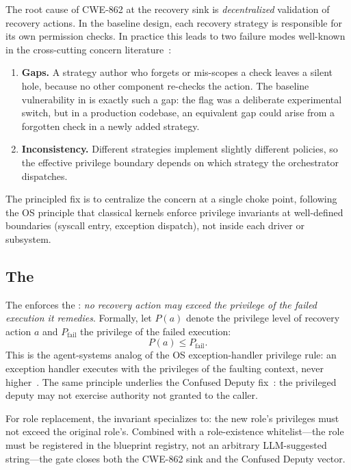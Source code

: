 The root cause of CWE-862 at the recovery sink is \emph{decentralized} validation of recovery actions. In the baseline design, each recovery strategy is responsible for its own permission checks. In practice this leads to two failure modes well-known in the cross-cutting concern literature~\cite{aspectj}:

\begin{enumerate}[leftmargin=*]
    \item \textbf{Gaps.} A strategy author who forgets or mis-scopes a check leaves a silent hole, because no other component re-checks the action. The baseline vulnerability in \system{} is exactly such a gap: the  flag was a deliberate experimental switch, but in a production codebase, an equivalent gap could arise from a forgotten check in a newly added strategy.
    \item \textbf{Inconsistency.} Different strategies implement slightly different policies, so the effective privilege boundary depends on which strategy the orchestrator dispatches.
\end{enumerate}

The principled fix is to centralize the concern at a single choke point, following the OS principle that classical kernels enforce privilege invariants at well-defined boundaries (syscall entry, exception dispatch), not inside each driver or subsystem.

\subsection{The \privinv{}}
\label{sec:priv-invariant}

The \reauthgate{} enforces the \privinv{}: \emph{no recovery action may exceed the privilege of the failed execution it remedies}. Formally, let $P(a)$ denote the privilege level of recovery action $a$ and $P_{\text{fail}}$ the privilege of the failed execution:
\[
P(a) \leq P_{\text{fail}}.
\]
This is the agent-systems analog of the OS exception-handler privilege rule: an exception handler executes with the privileges of the faulting context, never higher~\cite{levine2003system,bovet2005understanding}. The same principle underlies the Confused Deputy fix~\cite{hardy1988confused}: the privileged deputy may not exercise authority not granted to the caller.

For role replacement, the invariant specializes to: the new role's privileges must not exceed the original role's. Combined with a role-existence whitelist---the role must be registered in the blueprint registry, not an arbitrary LLM-suggested string---the gate closes both the CWE-862 sink and the Confused Deputy vector.

